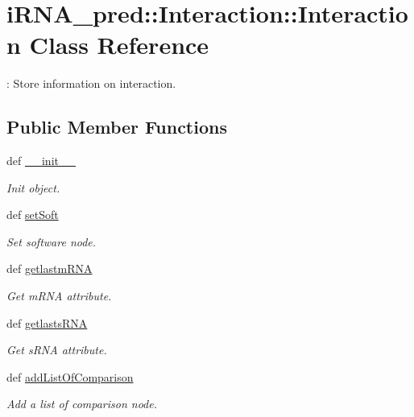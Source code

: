 \hypertarget{classiRNA__pred_1_1Interaction_1_1Interaction}{
\section{i\-R\-N\-A\-\_\-pred\-:\-:\-Interaction\-:\-:\-Interaction \-Class \-Reference}
\label{classiRNA__pred_1_1Interaction_1_1Interaction}
}


\-: \-Store information on interaction.  


\subsection*{\-Public \-Member \-Functions}
\begin{DoxyCompactItemize}
\item 
def \hyperlink{classiRNA__pred_1_1Interaction_1_1Interaction_a068604af8d5786cdf32161759aa9b27d}{\-\_\-\-\_\-init\-\_\-\-\_\-}
\begin{DoxyCompactList}\small\item\em \-Init object. \end{DoxyCompactList}\item 
def \hyperlink{classiRNA__pred_1_1Interaction_1_1Interaction_a66f32ad3e3e9701bb16b8aca846f82ff}{set\-Soft}
\begin{DoxyCompactList}\small\item\em \-Set software node. \end{DoxyCompactList}\item 
def \hyperlink{classiRNA__pred_1_1Interaction_1_1Interaction_aaa4f5f2bbc2d435d5f3680a7fe8ac1e8}{getlastm\-R\-N\-A}
\begin{DoxyCompactList}\small\item\em \-Get m\-R\-N\-A attribute. \end{DoxyCompactList}\item 
def \hyperlink{classiRNA__pred_1_1Interaction_1_1Interaction_aa2694d98f70ebc01302e2b151f23eb86}{getlasts\-R\-N\-A}
\begin{DoxyCompactList}\small\item\em \-Get s\-R\-N\-A attribute. \end{DoxyCompactList}\item 
def \hyperlink{classiRNA__pred_1_1Interaction_1_1Interaction_acc2e23ab48c48d443f001b2824afa806}{add\-List\-Of\-Comparison}
\begin{DoxyCompactList}\small\item\em \-Add a list of comparison node. \end{DoxyCompactList}\item 

\end{DoxyCompactItemize}
